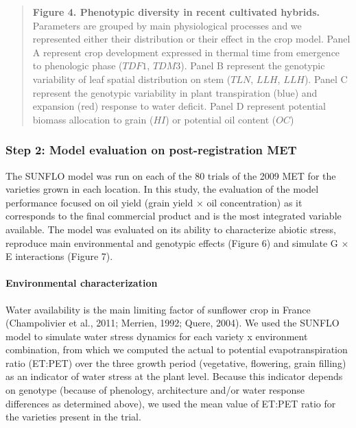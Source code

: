 \documentclass[a4paper]{article}
\let\oldparagraph\paragraph
\renewcommand{\paragraph}[1]{\oldparagraph{#1}\mbox{}}
\begin{document}
\begin{quote}
\textbf{Figure 4. Phenotypic diversity in recent cultivated hybrids.}
Parameters are grouped by main physiological processes and we
represented either their distribution or their effect in the crop model.
Panel A represent crop development expressed in thermal time from
emergence to phenologic phase (\(TDF1\), \(TDM3\)). Panel B represent
the genotypic variability of leaf spatial distribution on stem (\(TLN\),
\(LLH\), \(LLH\)). Panel C represent the genotypic variability in plant
transpiration (blue) and expansion (red) response to water deficit.
Panel D represent potential biomass allocation to grain (\(HI\)) or
potential oil content (\(OC\))
\end{quote}

\subsubsection{Step 2: Model evaluation on post-registration
MET}\label{step-2-model-evaluation-on-post-registration-met}

The SUNFLO model was run on each of the 80 trials of the 2009 MET for
the varieties grown in each location. In this study, the evaluation of
the model performance focused on oil yield (grain yield \(\times\) oil
concentration) as it corresponds to the final commercial product and is
the most integrated variable available. The model was evaluated on its
ability to characterize abiotic stress, reproduce main environmental and
genotypic effects (Figure 6) and simulate G \(\times\) E interactions
(Figure 7).

\paragraph{Environmental
characterization}\label{environmental-characterization}

Water availability is the main limiting factor of sunflower crop in
France (Champolivier et al., 2011; Merrien, 1992; Quere, 2004). We used
the SUNFLO model to simulate water stress dynamics for each variety x
environment combination, from which we computed the actual to potential
evapotranspiration ratio (ET:PET) over the three growth period
(vegetative, flowering, grain filling) as an indicator of water stress
at the plant level. Because this indicator depends on genotype (because
of phenology, architecture and/or water response differences as
determined above), we used the mean value of ET:PET ratio for the
varieties present in the trial.
\end{document}
